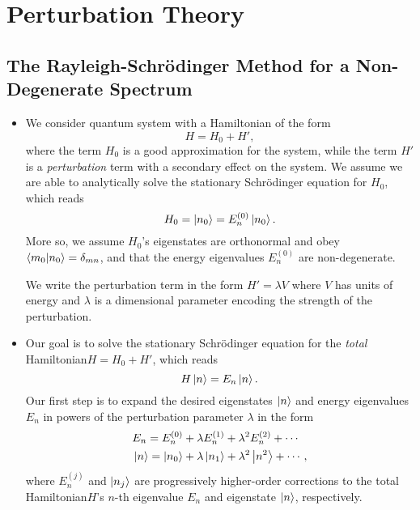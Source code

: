\documentclass[11pt, a4paper]{article}
\newcommand{\Schro}{Schr\"{o}dinger\xspace}
\newcommand{\Ham}{Hamiltonian\xspace}
\begin{document}

\newpage
\section{Perturbation Theory}

\subsection{The Rayleigh-\Schro Method for a Non-Degenerate Spectrum}
\begin{itemize}
    \item We consider quantum system with a \Ham of the form 
    \begin{equation*}
        H = H_{0} + H',
    \end{equation*}
    where the term $ H_{0} $ is a good approximation for the system, while the term $ H' $ is a \textit{perturbation} term with a secondary effect on the system. We assume we are able to analytically solve the stationary \Schro equation for $ H_{0} $, which reads
    \begin{equation*}
        H_{0} = \ket{n_{0}} = E_{n}^{(0)} \ket{n_{0}}.
    \end{equation*}
    More so, we assume $ H_{0} $'s eigenstates are orthonormal and obey $ \braket{m_{0}}{n_{0}} = \delta_{mn} $, and that the energy eigenvalues $ E_{n}^{(0)} $ are non-degenerate. 

    We write the perturbation term in the form $ H' = \lambda V $ where $ V $ has units of energy and $ \lambda $ is a dimensional parameter encoding the strength of the perturbation. 

    \item Our goal is to solve the stationary \Schro equation for the \textit{total} \Ham $ H = H_{0} + H' $, which reads
    \begin{equation*}
        H \ket{n} = E_{n}\ket{n}.
    \end{equation*}
    Our first step is to expand the desired eigenstates $ \ket{n} $ and energy eigenvalues $ E_{n} $ in powers of the perturbation parameter $ \lambda $ in the form
    \begin{align*}
        &E_{n} = E_{n}^{(0)} + \lambda E_{n}^{(1)} + \lambda^{2} E_{n}^{(2)} + \cdots\\
        &\ket{n} = \ket{n_{0}} + \lambda \ket{n_{1}} + \lambda^{2} \ket{n^{2}} + \cdots,
    \end{align*}
    where $ E_{n}^{(j)} $ and $ \ket{n_{j}} $ are progressively higher-order corrections to the total \Ham $ H $'s $ n $-th eigenvalue $ E_{n} $ and eigenstate $ \ket{n} $, respectively.


\end{itemize}
\end{document}
